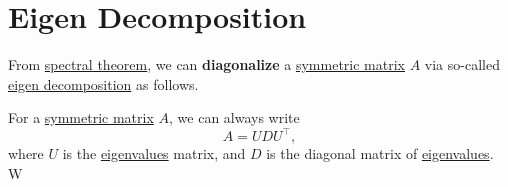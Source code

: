 
\newcommand*{\horzbar}{\rule[.5ex]{2.5ex}{0.5pt}}
\section{Eigen Decomposition}
From \hyperref[thm:spectral-theorem]{spectral theorem}, we can \textbf{diagonalize} a \hyperref[def:symmetric-matrix]{symmetric matrix} \(A\)
via so-called \hyperref[thm:eigen-decomposition]{eigen decomposition} as follows.

\begin{theorem}\label{thm:eigen-decomposition}
	For a \hyperref[def:symmetric-matrix]{symmetric matrix} \(A\), we can always write
	\[
		A = U D U^{\top},
	\]
	where \(U\) is the \hyperref[def:eigenvalue]{eigenvalues} matrix, and \(D\) is the diagonal matrix of \hyperref[def:eigenvalue]{eigenvalues}. W
\end{theorem}
